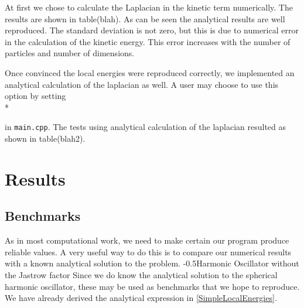\documentclass[english, a4paper]{article}
\makeatletter
\renewcommand{\subsubsection}{\@startsection{subsubsection}{3}{0pt}%
{-\baselineskip}{0.5\baselineskip}{\bf\large}}
\makeatother
\begin{document}
At first we chose to calculate the Laplacian in the kinetic term numerically. 
The results are shown in table(blah).
As can be seen the analytical results are well reproduced. 
The standard deviation is not zero, but this is due to numerical error in the calculation of the kinetic energy.
This error increases with the number of particles and number of dimensions. 

Once convinced the local energies were reproduced correctly, we implemented an analytical calculation of the laplacian as well.
A user may choose to use this option by setting 
\\*


\noindent in \texttt{main.cpp}. The tests using analytical calculation of the laplacian resulted as shown in table(blah2).

\section{Results}


\subsection{Benchmarks}
As in most computational work, we need to make certain our program produce reliable values. 
A very useful way to do this is to compare our numerical results with a known analytical solution to the problem. 
\subsubsection{Harmonic Oscillator without the Jastrow factor}
Since we do know the analytical solution to the spherical harmonic oscillator, these may be used as benchmarks that we hope to reproduce.
We have already derived the analytical expression in \eqref{SimpleLocalEnergies}. 
\end{document}
